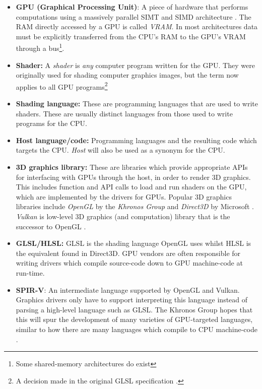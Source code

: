 \documentclass[a4paper,12pt,twoside,openright]{report}
\begin{document}
\begin{itemize}

    \item \textbf{GPU (Graphical Processing Unit)}: A piece of hardware that
    performs computations using a massively parallel SIMT and SIMD architecture
    \cite{GPUSIMTSIMD}. The RAM directly accessed by a GPU is called
    \textit{VRAM}. In most architectures data must be explicitly transferred
    from the CPU's RAM to the GPU's VRAM through a bus\footnote{Some
    shared-memory architectures do exist\cite{PS4SpecAnalysis}}.

    \item \textbf{Shader:} A \textit{shader} is \textit{any} computer program
    written for the GPU. They were originally used for shading computer
    graphics images, but the term now applies to all GPU programs\footnote{A
    decision made in the original GLSL specification \cite{GLSL_1_10}.}

    \item \textbf{Shading language:} These are programming languages that are
    used to write shaders. These are usually distinct languages from those used
    to write programs for the CPU.

    \item \textbf{Host language/code:} Programming languages and the resulting
    code which targets the CPU. \textit{Host} will also be used as a synonym
    for the CPU.

    \item \textbf{3D graphics library:} These are libraries which provide
    appropriate APIs for interfacing with GPUs through the host, in order to
    render 3D graphics. This includes function and API calls to load and run
    shaders on the GPU, which are implemented by the drivers for GPUs. Popular
    3D graphics libraries include \textit{OpenGL} by the \textit{Khronos Group}
    and \textit{Direct3D} by Microsoft \cite{OpenGL} \cite{Direct3D}.
    \textit{Vulkan} is low-level 3D graphics (and computation) library that is
    the successor to OpenGL \cite{Vulkan}.

    \item \textbf{GLSL/HLSL:} GLSL is the shading language OpenGL uses whilst
    HLSL is the equivalent found in Direct3D. GPU vendors are often responsible
    for writing drivers which compile source-code down to GPU machine-code at
    run-time.

    \item \textbf{SPIR-V}: An intermediate language supported by OpenGL and
    Vulkan. Graphics drivers only have to support interpreting this language
    instead of parsing a high-level language such as GLSL. The Khronos Group
    hopes that this will spur the development of many varieties of GPU-targeted
    languages, similar to how there are many languages which compile to CPU
    machine-code \cite{SPIRV}.

\end{itemize}
\end{document}
